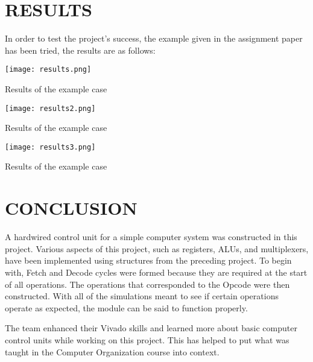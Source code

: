 \documentclass[pdftex,12pt,a4paper]{article}
\begin{document}
\newpage

\section{RESULTS}
In order to test the project's success, the example given in the assignment paper has been tried, the results are as follows:

\begin{figure1231}
	\centering
	\texttt{[image: results.png]}	
	\caption{Results of the example case}
	\label{fig1}
\end{figure1231}

\begin{figure1331}
	\centering
	\texttt{[image: results2.png]}	
	\caption{Results of the example case}
	\label{fig1}
\end{figure1331}

\begin{figure1431}
	\centering
	\texttt{[image: results3.png]}	
	\caption{Results of the example case}
	\label{fig1}
\end{figure1431}

\newpage

\section{CONCLUSION}
A hardwired control unit for a simple computer system was constructed in this project. Various aspects of this project, such as registers, ALUs, and multiplexers, have been implemented using structures from the preceding project. To begin with, Fetch and Decode cycles were formed because they are required at the start of all operations. The operations that corresponded to the Opcode were then constructed. With all of the simulations meant to see if certain operations operate as expected, the module can be said to function properly.

\par The team enhanced their Vivado skills and learned more about basic computer control units while working on this project. This has helped to put what was taught in the Computer Organization course into context.
\end{document}
